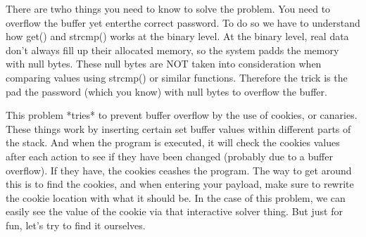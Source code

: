 \documentclass [12 pt, twoside] {article}
\begin{document}
There are twho things you need to know to solve the problem. You need to overflow the buffer
yet enterthe correct password. To do so we have to understand how get() and strcmp() works
at the binary level. At the binary level, real data don't always fill up their allocated
memory, so the system padds the memory with null bytes. These null bytes are NOT taken into
consideration when comparing values using strcmp() or similar functions. Therefore the trick
is the pad the password (which you know) with null bytes to overflow the buffer.


This problem *tries* to prevent buffer overflow by the use of cookies, or canaries. These
things work by inserting certain set buffer values within different parts of the stack. And
when the program is executed, it will check the cookies values after each action to see
if they have been changed (probably due to a buffer overflow). If they have, the cookies 
ceashes the program. The way to get around this is to find the cookies, and when entering your
payload, make sure to rewrite the cookie location with what it should be. In the case of this
problem, we can easily see the value of the cookie via that interactive solver thing. But just
for fun, let's try to find it ourselves.
\end{document}
